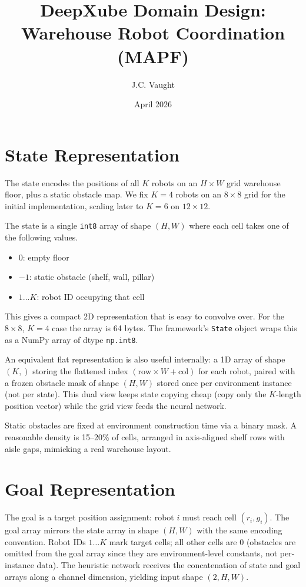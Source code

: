 \documentclass[11pt]{article}
\title{DeepXube Domain Design:\\Warehouse Robot Coordination (MAPF)}
\author{J.C. Vaught}
\date{April 2026}
\begin{document}
\maketitle

\section{State Representation}

The state encodes the positions of all $K$ robots on an $H \times W$ grid warehouse floor, plus a static obstacle map. We fix $K = 4$ robots on an $8 \times 8$ grid for the initial implementation, scaling later to $K = 6$ on $12 \times 12$.

The state is a single \texttt{int8} array of shape $(H, W)$ where each cell takes one of the following values.

\begin{itemize}[nosep]
    \item $0$: empty floor
    \item $-1$: static obstacle (shelf, wall, pillar)
    \item $1 \ldots K$: robot ID occupying that cell
\end{itemize}

This gives a compact 2D representation that is easy to convolve over. For the $8 \times 8$, $K = 4$ case the array is 64 bytes. The framework's \texttt{State} object wraps this as a NumPy array of dtype \texttt{np.int8}.

An equivalent flat representation is also useful internally: a 1D array of shape $(K,)$ storing the flattened index $(\text{row} \times W + \text{col})$ for each robot, paired with a frozen obstacle mask of shape $(H, W)$ stored once per environment instance (not per state). This dual view keeps state copying cheap (copy only the $K$-length position vector) while the grid view feeds the neural network.

Static obstacles are fixed at environment construction time via a binary mask. A reasonable density is 15--20\% of cells, arranged in axis-aligned shelf rows with aisle gaps, mimicking a real warehouse layout.

\section{Goal Representation}

The goal is a target position assignment: robot $i$ must reach cell $(r_i, g_i)$. The goal array mirrors the state array in shape $(H, W)$ with the same encoding convention. Robot IDs $1 \ldots K$ mark target cells; all other cells are $0$ (obstacles are omitted from the goal array since they are environment-level constants, not per-instance data). The heuristic network receives the concatenation of state and goal arrays along a channel dimension, yielding input shape $(2, H, W)$.
\end{document}
